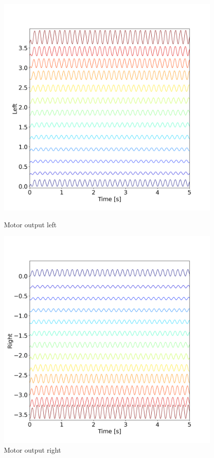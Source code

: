 \documentclass{cmc}
\begin{document}
\begin{figure}[H]
    \centering
    \begin{minipage}{0.38\textwidth}
        \centering
        \includegraphics[width=\linewidth]{our_figures/Motor_ex5 _Left.png}
        \caption{Motor output left}
        \label{fig:Motor_ex5_Left}
    \end{minipage}
    \hfill
    \begin{minipage}{0.38\textwidth}
        \centering
        \includegraphics[width=\linewidth]{our_figures/Motor_ex5 _Right.png}
        \caption{Motor output right}
        \label{fig:Motor_ex5_Right}
    \end{minipage}
\end{figure}
\end{document}
